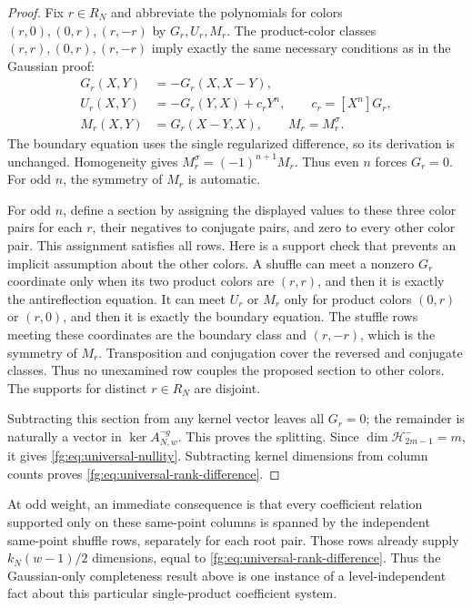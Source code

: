 \documentclass[11pt,a4paper]{article}
\theoremstyle{definition}
\theoremstyle{remark}
\numberwithin{equation}{section}
\begin{document}
\begin{proof}
Fix $r\in R_N$ and abbreviate the polynomials for colors
$(r,0),(0,r),(r,-r)$ by $G_r,U_r,M_r$. The product-color classes
$(r,r),(0,r),(r,-r)$ imply exactly the same necessary conditions
as in the Gaussian proof:
\begin{align*}
 G_r(X,Y)&=-G_r(X,X-Y),\\
 U_r(X,Y)&=-G_r(Y,X)+c_rY^n,\qquad c_r=[X^n]G_r,\\
 M_r(X,Y)&=G_r(X-Y,X),\qquad M_r=M_r^\sigma.
\end{align*}
The boundary equation uses the single regularized difference,
so its derivation is unchanged. Homogeneity gives
$M_r^\sigma=(-1)^{n+1}M_r$. Thus even $n$ forces $G_r=0$.
For odd $n$, the symmetry of $M_r$ is automatic.

For odd $n$, define a section by assigning the displayed values to
these three color pairs for each $r$, their negatives to conjugate
pairs, and zero to every other color pair. This assignment satisfies
all rows. Here is a support check that prevents an implicit assumption
about the other colors. A shuffle can meet a nonzero $G_r$ coordinate
only when its two product colors are $(r,r)$, and then it is exactly
the antireflection equation. It can meet $U_r$ or $M_r$ only for
product colors $(0,r)$ or $(r,0)$, and then it is exactly the boundary
equation. The stuffle rows meeting these coordinates are the boundary
class and $(r,-r)$, which is the symmetry of $M_r$. Transposition
and conjugation cover the reversed and conjugate classes. Thus no
unexamined row couples the proposed section to other colors.
The supports for distinct $r\in R_N$ are disjoint.

Subtracting this section from any kernel vector leaves all $G_r=0$;
the remainder is naturally a vector in $\ker A_{N,w}^{\neg g}$.
This proves the splitting. Since
$\dim\mathcal H_{2m-1}^-=m$, it gives
\eqref{fg:eq:universal-nullity}. Subtracting kernel dimensions from
column counts proves \eqref{fg:eq:universal-rank-difference}.
\end{proof}

At odd weight, an immediate consequence is that every coefficient
relation supported only on these same-point columns is spanned by
the independent same-point shuffle rows, separately for each root
pair. Those rows already supply $k_N(w-1)/2$ dimensions, equal to
\eqref{fg:eq:universal-rank-difference}. Thus the Gaussian-only
completeness result above is one instance of a level-independent
fact about this particular single-product coefficient system.
\end{document}
